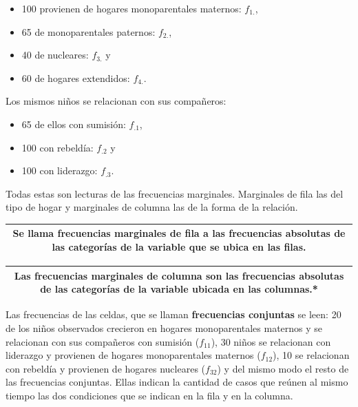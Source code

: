 \documentclass[]{book}
\providecommand{\tightlist}{%
  \setlength{\itemsep}{0pt}\setlength{\parskip}{0pt}}
\begin{document}
\begin{itemize}
\tightlist
\item
  100 provienen de hogares monoparentales maternos: \(f_{1.}\),
\item
  65 de monoparentales paternos: \(f_{2.}\),
\item
  40 de nucleares: \(f_{3.}\) y
\item
  60 de hogares extendidos: \(f_{4.}\).
\end{itemize}

Los mismos niños se relacionan con sus compañeros:

\begin{itemize}
\tightlist
\item
  65 de ellos con sumisión: \(f_{.1}\),
\item
  100 con rebeldía: \(f_{.2}\) y
\item
  100 con liderazgo: \(f_{.3}\).
\end{itemize}

Todas estas son lecturas de las frecuencias marginales. Marginales de fila las del tipo de hogar y marginales de columna las de la forma de la relación.

\begin{longtable}[]{@{}c@{}}
\toprule
\endhead
\begin{minipage}[t]{0.97\columnwidth}\centering
Se llama \textbf{frecuencias marginales de fila} a las frecuencias absolutas de las categorías de la variable que se ubica en las filas.\strut
\end{minipage}\tabularnewline
\bottomrule
\end{longtable}

\begin{longtable}[]{@{}c@{}}
\toprule
\endhead
\begin{minipage}[t]{0.97\columnwidth}\centering
Las \textbf{frecuencias marginales de columna} son las frecuencias absolutas de las categorías de la variable ubicada en las columnas.*\strut
\end{minipage}\tabularnewline
\bottomrule
\end{longtable}

Las frecuencias de las celdas, que se llaman \textbf{frecuencias conjuntas}
se leen: 20 de los niños observados crecieron en hogares monoparentales
maternos y se relacionan con sus compañeros con sumisión (\(f_{11}\)), 30
niños se relacionan con liderazgo y provienen de hogares monoparentales
maternos (\(f_{12}\)), 10 se relacionan con rebeldía y provienen de hogares
nucleares (\(f_{32}\)) y del mismo modo el resto de las frecuencias
conjuntas. Ellas indican la cantidad de casos que reúnen al mismo tiempo
las dos condiciones que se indican en la fila y en la columna.
\end{document}
